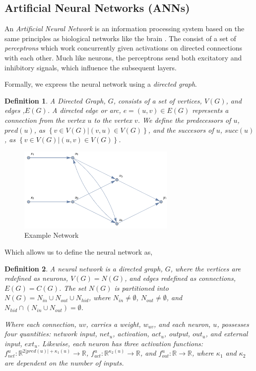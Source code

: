 \documentclass[twoside, 12pt]{article}
\theoremstyle{plain}
\newtheorem{definition}{Definition}
\begin{document}
\subsection{Artificial Neural Networks (ANNs)}
An \textit{Artificial Neural Network} is an information processing system based on the same principles as biological networks like the brain \cite{rudolf_computational_nodate}. The consist of a set of \textit{perceptrons} which work concurrently given activations on directed connections with each other. Much like neurons, the perceptrons send both excitatory and inhibitory signals, which influence the subsequent layers.

Formally, we express the neural network using a \textit{directed graph}.
\begin{definition}
\normalfont A \textit{Directed Graph}, $G$, consists of a set of \textit{vertices}, $V(G)$, and \textit{edges} ,$E(G)$. A \textit{directed edge} or \textit{arc}, $e = (u,v)\in E(G)$ represents a connection from the vertex $u$ to the vertex $v$. We define the \textit{predecessors} of $u$, $\textit{pred}(u)$, as $\left\{v\in V(G)\vert (v,u)\in V(G)\right\}$, and the \textit{succesors} of $u$, $\textit{succ}(u)$, as $\left\{v\in V(G)\vert (u,v)\in V(G)\right\}$.
\end{definition}
\begin{figure}[ht]
  \centering
  \includegraphics[width=3in]{DiGraph.pdf}
  \caption{Example Network}
  \label{fig:digraph}
\end{figure}
Which allows us to define the neural network as,
\begin{definition}
\normalfont A \textit{neural network} is a directed graph, $G$, where the vertices are redefined as \textit{neurons}, $V(G)=N(G)$, and edges redefined as \textit{connections}, $E(G)=C(G)$. The set $N(G)$ is partitioned into $N(G)=N_{in} \cup N_{out} \cup N_{hid}$, where $N_{in}\not =\emptyset$, $N_{out}\not = \emptyset$, and $N_{hid}\cap\left(N_{in}\cup N_{out}\right)=\emptyset$.

Where each connection, $uv$, carries a weight, $w_{uv}$, and each neuron, $u$, possesses four quantities: network input, $net_{u}$, activation, $act_{u}$, output, $out_{u}$, and external input, $ext_{u}$. Likewise, each neuron has three activation functions: $f^{u}_{net}:\mathbb{R}^{2\left\vert pred(u)\right\vert+\kappa_{1}(u)}\rightarrow \mathbb{R}$, $f^{u}_{act}:\mathbb{R}^{\kappa_2(u)}\rightarrow \mathbb{R}$, and $f^{u}_{out}:\mathbb{R}\rightarrow \mathbb{R}$, where $\kappa_{1}$ and $\kappa_{2}$ are dependent on the number of inputs.
\end{definition}
\end{document}

